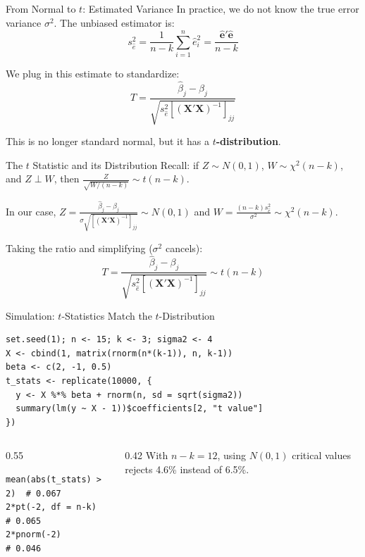\documentclass[aspectratio=169, handout, t]{beamer}
\numberwithin{equation}{section}
\begin{document}
\begin{frame}{From Normal to $t$: Estimated Variance}
In practice, we do not know the true error variance \( \sigma^2 \).  
The unbiased estimator is:
\[
s_{\hat{e}}^2 = \frac{1}{n - k} \sum_{i=1}^n \hat{e}_i^2 = \frac{\hat{\bm{e}}' \hat{\bm{e}}}{n - k}
\]

We plug in this estimate to standardize:
\[
T = \frac{\hat{\beta}_j - \beta_j}{\sqrt{s_{\hat{e}}^2 \left[(\bm{X'X})^{-1}\right]_{jj}}}
\]

This is no longer standard normal, but it has a \textbf{$t$-distribution}.
\end{frame}

\begin{frame}{The $t$ Statistic and its Distribution}
Recall: if $Z \sim N(0, 1)$, $W \sim \chi^2(n - k)$, and $Z \perp W$, then $\frac{Z}{\sqrt{W/(n - k)}} \sim t(n - k)$.\pause

\medskip
In our case, $Z=\frac{\hat{\beta}_j - \beta_j}{\sigma\sqrt{[(\bm{X'X})^{-1}]_{jj}}} \sim N(0, 1)$ \quad and \quad $W=\frac{(n - k) s_{\hat{e}}^2}{\sigma^2} \sim \chi^2(n - k)$.\pause

\medskip
Taking the ratio and simplifying ($\sigma^2$ cancels):
\[
T = \frac{\hat{\beta}_j - \beta_j}{\sqrt{s_{\hat{e}}^2 \left[(\bm{X'X})^{-1}\right]_{jj}}}
\sim t(n - k)
\]
\end{frame}


\begin{frame}[fragile]{Simulation: $t$-Statistics Match the $t$-Distribution}
\begin{lstlisting}[style=Rstyle]
set.seed(1); n <- 15; k <- 3; sigma2 <- 4
X <- cbind(1, matrix(rnorm(n*(k-1)), n, k-1))
beta <- c(2, -1, 0.5)
t_stats <- replicate(10000, {
  y <- X %*% beta + rnorm(n, sd = sqrt(sigma2))
  summary(lm(y ~ X - 1))$coefficients[2, "t value"]
})
\end{lstlisting}\pause
\vspace{-4pt}
\begin{columns}
\begin{column}{0.55\textwidth}
\begin{lstlisting}[style=Rstyle]
mean(abs(t_stats) > 2)  # 0.067
2*pt(-2, df = n-k)      # 0.065
2*pnorm(-2)             # 0.046
\end{lstlisting}
\end{column}
\begin{column}{0.42\textwidth}
\small With $n{-}k=12$, using $N(0,1)$ critical values rejects 4.6\% instead of 6.5\%.
\end{column}
\end{columns}
\end{frame}
\end{document}
